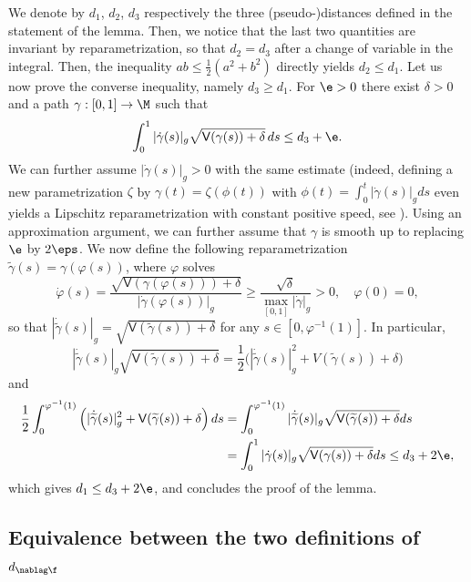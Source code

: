\bnp
We denote by $d_1$, $d_2$, $d_3$ respectively the three (pseudo-)distances defined in the statement of the lemma.
Then, we notice that the last two quantities are invariant by reparametrization, so that $d_2=d_3$ after a change of variable in the integral. Then, the inequality $ab\leq \frac{1}{2}(a^2+b^2)$ directly yields $d_2\leq d_1$. Let us now prove the converse inequality, namely $d_3 \geq d_1$. For $\e>0$ there exist $\delta>0$ and a path $\gamma:[0,1]\to \M$ such that\vspace*{-3pt}
\[
\int_0^1 |\dot{\gamma}(s)|_g\sqrt{\mathsf{V}(\gamma(s))+\delta} \, ds\leq d_{3}+\e.
\]
We can further assume $|\dot{\gamma}(s)|_g>0$ with the same estimate (indeed, defining a new parametrization $\zeta$ by $\gamma(t) = \zeta(\phi(t))$ with $\phi(t) = \int_0^t |\dot{\gamma}(s)|_g ds$ even yields a Lipschitz reparametrization with constant positive speed, see \eg \cite[Proof of Lem.\,3.16]{BarilariAgrachevBoscainBook:20}). Using an approximation argument, we can further assume that $\gamma$ is smooth up to replacing $\e$ by $2\eps$.
We now define the following reparametrization $\widetilde{\gamma}(s)=\gamma(\varphi(s))$, where $\varphi$ solves\vspace*{-3pt}
\[
\dot{\varphi}(s)=\frac{\sqrt{\mathsf{V}(\gamma(\varphi(s)))+\delta}}{|\dot{\gamma}(\varphi(s))|_g}\geq \frac{\sqrt{\delta}}{\max_{[0,1]} |\dot{\gamma}|_g}>0,\quad \varphi(0)=0,
\]
so that $|\dot{\widetilde{\gamma}}(s)|_g=\sqrt{\mathsf{V}(\widetilde{\gamma}(s))+\delta} $ for any $s\in [0,\varphi^{-1}(1)]$. In particular,
\[
|\dot{\widetilde{\gamma}}(s)|_g\sqrt{\mathsf{V}(\widetilde{\gamma}(s))+\delta}=\frac12\bigl(|\dot{\widetilde{\gamma}}(s)|_g^2+V(\widetilde{\gamma}(s))+\delta\bigr)
\]
and\vspace*{-3pt}
\begin{align*}
\frac12 \int_0^{\varphi^{-1}(1)}\left(|\dot{\widetilde{\gamma}}(s)|_g^2+\mathsf{V}(\widetilde{\gamma}(s))+\delta\right) ds
& = \int_0^{\varphi^{-1}(1)} |\dot{\widetilde{\gamma}}(s)|_g\sqrt{\mathsf{V}(\widetilde{\gamma}(s))+\delta} ds \\
&=\int_0^1 |\dot{\gamma}(s)|_g\sqrt{\mathsf{V}(\gamma(s))+\delta} ds\leq d_{3}+2\e,
\end{align*}
which gives $d_1\leq d_3+2\e$, and concludes the proof of the lemma.
\enp

\subsection{Equivalence between the two definitions of $d_{\nablag \f}$}

